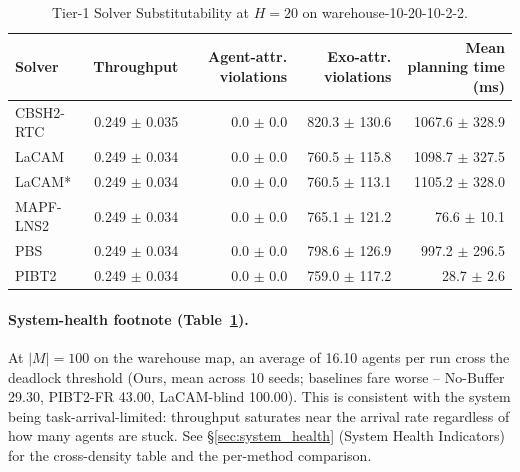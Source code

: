 \begin{table}[t]
\centering
\small
\begin{tabular}{lrrrr}
\toprule
Solver & Throughput & Agent-attr. violations & Exo-attr. violations & Mean planning time (ms) \\
\midrule
CBSH2-RTC & 0.249 $\pm$ 0.035 & 0.0 $\pm$ 0.0 & 820.3 $\pm$ 130.6 & 1067.6 $\pm$ 328.9 \\
LaCAM & 0.249 $\pm$ 0.034 & 0.0 $\pm$ 0.0 & 760.5 $\pm$ 115.8 & 1098.7 $\pm$ 327.5 \\
LaCAM* & 0.249 $\pm$ 0.034 & 0.0 $\pm$ 0.0 & 760.5 $\pm$ 113.1 & 1105.2 $\pm$ 328.0 \\
MAPF-LNS2 & 0.249 $\pm$ 0.034 & 0.0 $\pm$ 0.0 & 765.1 $\pm$ 121.2 & 76.6 $\pm$ 10.1 \\
PBS & 0.249 $\pm$ 0.034 & 0.0 $\pm$ 0.0 & 798.6 $\pm$ 126.9 & 997.2 $\pm$ 296.5 \\
PIBT2 & 0.249 $\pm$ 0.034 & 0.0 $\pm$ 0.0 & 759.0 $\pm$ 117.2 & 28.7 $\pm$ 2.6 \\
\bottomrule
\end{tabular}
\caption{Tier-1 Solver Substitutability at $H = 20$ on warehouse-10-20-10-2-2.}
\label{tab:solver_subst_warehouse-10-20-10-2-2}
\end{table}


\paragraph{System-health footnote (Table~\ref{tab:solver_subst_warehouse-10-20-10-2-2}).}
At $|M| = 100$ on the warehouse map, an average of 16.10 agents per
run cross the deadlock threshold (Ours, mean across 10 seeds;
baselines fare worse -- No-Buffer 29.30, PIBT2-FR 43.00,
LaCAM-blind 100.00).  This is consistent with the system being
task-arrival-limited: throughput saturates near the arrival rate
regardless of how many agents are stuck.  See
\S\ref{sec:system_health} (System Health Indicators) for the
cross-density table and the per-method comparison.
